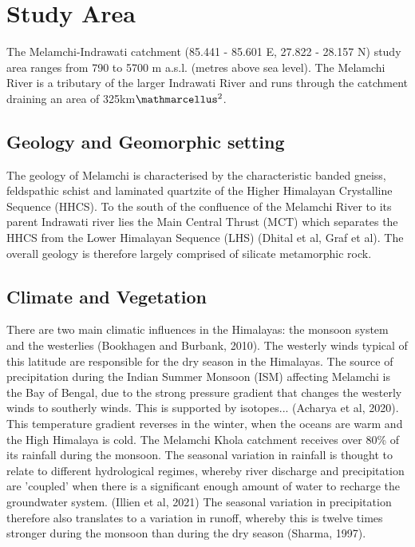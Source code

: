 
\section{Study Area}



The Melamchi-Indrawati catchment (85.441 - 85.601 E, 27.822 - 28.157 N) study area ranges from 790 to 5700 m a.s.l. (metres above sea level). The Melamchi River is a tributary of the larger Indrawati River and runs through the catchment draining an area of 325km$\ttmath{^2}$. 

\subsection{Geology and Geomorphic setting}


The geology of Melamchi is characterised by the characteristic banded gneiss, feldspathic schist and laminated quartzite of the Higher Himalayan Crystalline Sequence (HHCS). To the south of the confluence of the Melamchi River to its parent Indrawati river lies the Main Central Thrust (MCT) which separates the HHCS from the Lower Himalayan Sequence (LHS) (Dhital et al, Graf et al). The overall geology is therefore largely comprised of silicate metamorphic rock.

\bsk
\subsection{Climate and Vegetation}


There are two main climatic influences in the Himalayas: the monsoon system and the westerlies (Bookhagen and Burbank, 2010). The westerly winds typical of this latitude are responsible for the dry season in the Himalayas. The source of precipitation during the Indian Summer Monsoon (ISM) affecting Melamchi is the Bay of Bengal, due to the strong pressure gradient that changes the westerly winds to southerly winds. This is supported by isotopes... (Acharya et al, 2020). This temperature gradient reverses in the winter, when the oceans are warm and the High Himalaya is cold.  The Melamchi Khola catchment receives over 80\% of its rainfall during the monsoon. The seasonal variation in rainfall is thought to relate to different hydrological regimes, whereby river discharge and precipitation are 'coupled' when there is a significant enough amount of water to recharge the groundwater system. (Illien et al, 2021) The seasonal variation in precipitation therefore also translates to a variation in runoff, whereby this is twelve times stronger during the monsoon than during the dry season (Sharma, 1997). 

